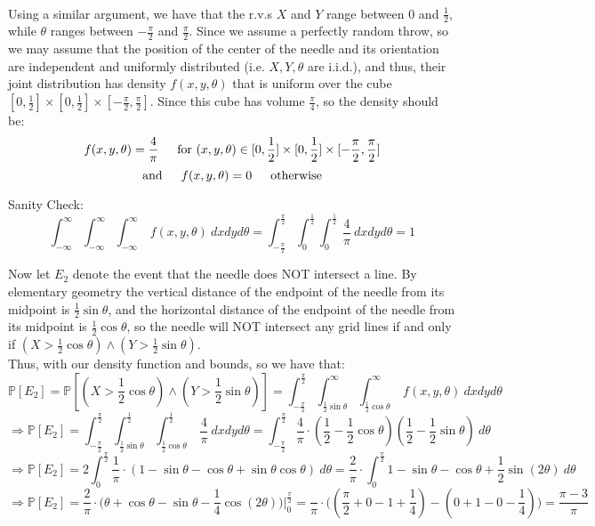 \documentclass{article}
\begin{document}
 \\

Using a similar argument, we have that the r.v.s $X$ and $Y$ range between 0 and $\frac{1}{2}$, while $\theta$ ranges between $-\frac{\pi}{2}$ and $\frac{\pi}{2}$. Since we assume a perfectly random throw, so we may assume that the position of the center of the needle and its orientation are independent and uniformly distributed (i.e. $X,Y,\theta$ are i.i.d.), and thus,
their joint distribution has density $f(x,y,\theta)$ that is uniform over the cube $[0,\frac{1}{2}] \times [0,\frac{1}{2}] \times [-\frac{\pi}{2}, \frac{\pi}{2}]$. Since this cube has volume $\frac{\pi}{4}$, so the density should be:
$$f(x,y,\theta) = \frac{4}{\pi} \indent \text{for } (x,y,\theta)\in [0,\frac{1}{2}] \times [0,\frac{1}{2}] \times [-\frac{\pi}{2}, \frac{\pi}{2}]$$
$$\text{and}\indent f(x,y,\theta) = 0 \indent \text{otherwise}$$

Sanity Check:
$$\int_{-\infty}^\infty
	\int_{-\infty}^\infty
		\int_{-\infty}^\infty\ f(x,y,\theta)\ dxdyd\theta =
\int_{-\frac{\pi}{2}}^\frac{\pi}{2}
	\int_{0}^\frac{1}{2}
		\int_{0}^\frac{1}{2}\ \frac{4}{\pi}\ dxdyd\theta = 1
$$

Now let $E_2$ denote the event that the needle does NOT intersect a line. By elementary geometry the vertical distance of the endpoint of the needle from its midpoint is $\frac{1}{2}\sin\theta$, and the horizontal distance of the endpoint of the needle from its midpoint is $\frac{1}{2}\cos\theta$, so the needle will NOT intersect any grid lines if and only if $(X > \frac{1}{2}\cos\theta) \land (Y > \frac{1}{2}\sin\theta)$. \\

Thus, with our density function and bounds, so we have that:
$$\mathbb{P}[E_2] =
\mathbb{P}[(X > \frac{1}{2}\cos\theta) \land (Y > \frac{1}{2}\sin\theta)] =
\int_{-\frac{\pi}{2}}^\frac{\pi}{2}
	\int_{\frac{1}{2}\sin\theta}^\infty
		\int_{\frac{1}{2}\cos\theta}^\infty\
			f(x,y,\theta)\ dxdyd\theta$$
$$\Longrightarrow \mathbb{P}[E_2] =
\int_{-\frac{\pi}{2}}^\frac{\pi}{2}
	\int_{\frac{1}{2}\sin\theta}^\frac{1}{2}
		\int_{\frac{1}{2}\cos\theta}^\frac{1}{2}\
			\frac{4}{\pi}\ dxdyd\theta =
\int_{-\frac{\pi}{2}}^\frac{\pi}{2}
	\frac{4}{\pi}\cdot
		(\frac{1}{2} - \frac{1}{2}\cos\theta)
		(\frac{1}{2} - \frac{1}{2}\sin\theta)\ d\theta$$
$$\Longrightarrow \mathbb{P}[E_2] =
2\int_{0}^\frac{\pi}{2}
	\frac{1}{\pi}\cdot(1 - \sin\theta - \cos\theta + \sin\theta\cos\theta)\ d\theta =
\frac{2}{\pi}\cdot \int_{0}^\frac{\pi}{2}
	1 - \sin\theta - \cos\theta + \frac{1}{2}\sin(2\theta)\ d\theta$$
$$\Longrightarrow \mathbb{P}[E_2] =
\frac{2}{\pi}\cdot
	\big(\theta + \cos\theta - \sin\theta - \frac{1}{4}\cos(2\theta)\big)
	\Big|_{0}^\frac{\pi}{2} =
\frac{}{\pi}\cdot
	\Big(
		(\frac{\pi}{2} + 0 - 1 + \frac{1}{4}) -
		(0 + 1 - 0 - \frac{1}{4})
	\Big) =
\frac{\pi-3}{\pi}$$
\end{document}
